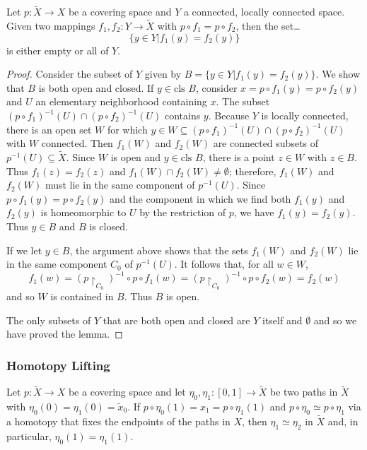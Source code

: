 \begin{lemma}
Let $p : \tilde X \rightarrow X$ be a covering space and $Y$ a connected, locally connected space. Given two mappings $f_1 , f_2 : Y \rightarrow \tilde X$ with $p \circ f_1 = p \circ f_2$, then the set\dots
$$\{ y \in Y | f_1(y) = f_2(y) \}$$
is either empty or all of $Y$.
\end{lemma}

\begin{proof}
Consider the subset of $Y$ given by $B = \{ y \in Y | f_1(y) = f_2(y) \}.$ We show that $B$ is both open and closed. If $y \in \textrm{cls } B$, consider $x= p \circ f_1(y) = p \circ f_2(y)$ and
$U$ an elementary neighborhood containing $x$. The subset $(p \circ f_1)^{-1}(U) \cap (p \circ f_2)^{-1}(U)$ contains $y$. Because $Y$ is locally connected, there is an open set $W$ for which $y \in W \subseteq (p \circ f_1)^{-1} (U) \cap (p \circ f_2)^{-1}(U)$
with $W$ connected. Then $f_1(W)$ and $f_2(W)$ are connected subsets of $p^{-1}(U) \subseteq \tilde X$. Since $W$ is open and $y \in \textrm{cls } B$, there is a point $z \in W$ with $z \in B$. Thus
$f_1(z) = f_2(z)$ and $f_1(W) \cap f_2(W) \neq \emptyset$; therefore, $f_1(W)$ and $f_2(W)$ must lie in the same component of $p^{-1}(U)$. Since $p \circ f_1(y) = p \circ f_2(y)$ and the component in which
we find both $f_1(y)$ and $f_2(y)$ is homeomorphic to $U$ by the restriction of $p$, we have $f_1(y) = f_2(y)$. Thus $y \in B$ and $B$ is closed.

If we let $y \in B$, the argument above shows that the sets $f_1(W)$ and $f_2(W)$ lie in the same component $C_0$ of $p^{-1}(U)$. It follows that, for all $w \in W$,
$$f_1(w) = (p \upharpoonright _{C_0})^{-1} \circ p \circ f_1(w) = (p \upharpoonright _{C_0})^{-1} \circ p \circ f_2(w) = f_2(w)$$
and so $W$ is contained in $B$. Thus $B$ is open.

The only subsets of $Y$ that are both open and closed are $Y$ itself and $\emptyset$ and so we have proved the lemma.
\end{proof}

\subsubsection{Homotopy Lifting}\label{homotopylifting}

\begin{theorem}
Let $p : \tilde X \rightarrow X$ be a covering space and let $\eta_0, \eta_1 : [0,1] \rightarrow \tilde X$ be two paths in $\tilde X$ with $\eta_0(0) = \eta_1(0) = \tilde x_0$. If
$p \circ \eta_0(1) = x_1 = p \circ \eta_1(1)$ and $p \circ \eta_0 \simeq p \circ \eta_1$ via a homotopy that fixes the endpoints of the paths in $X$, then $\eta_1 \simeq \eta_2$ in
$\tilde X$ and, in particular, $\eta_0(1) = \eta_1(1)$.
\end{theorem}

